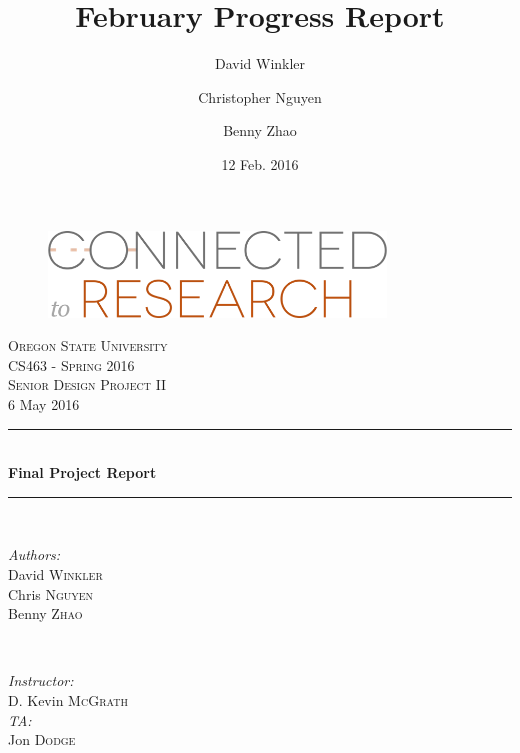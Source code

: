 \documentclass[onecolumn]{IEEEtran}
\title{February Progress Report}
\author{David Winkler \and Christopher Nguyen \and Benny Zhao}
\date{12 Feb. 2016}
\begin{document}
\begin{titlepage}
	\newcommand{\HRule}{\rule{\linewidth}{0.5mm}} %
	\center %
    
    \begin{figure}
        \centering
        \includegraphics[width=0.8\textwidth]{ctr_logo.png}
    \end{figure}
 
	\textsc{\LARGE Oregon State University}\\[1.5cm] %
	\textsc{\Large CS463 - Spring 2016}\\[0.5cm] %
	\textsc{\large Senior Design Project II}\\[0.5cm] %

	{\large 6 May 2016}\\[1cm]
    
	\HRule \\[0.4cm]
		{ \huge \bfseries Final Project Report}\\[0.4cm] %
	\HRule \\[1.5cm]

	\begin{minipage}{0.4\textwidth}
		\begin{flushleft} \large
			\emph{Authors:}\\
			David \textsc{Winkler}\\ %
			Chris \textsc{Nguyen}\\
			Benny \textsc{Zhao}
		\end{flushleft}
	\end{minipage}
	~
	\begin{minipage}{0.4\textwidth}
		\begin{flushright} \large
			\emph{Instructor:} \\
			D. Kevin \textsc{McGrath} \\
            \emph{TA:} \\
            Jon \textsc{Dodge}
		\end{flushright}
	\end{minipage}\\[2cm]
    

\end{titlepage}
\end{document}
